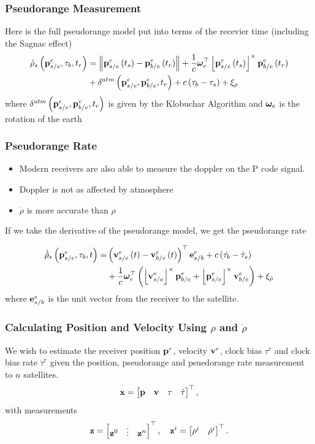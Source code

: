 \documentclass{beamer}
\newcommand{\norm}[1]{\left\lVert#1\right\rVert}
\begin{document}
\begin{frame}\frametitle{Pseudorange Measurement}
Here is the full pseudorange model put into terms of the recevier time (including the Sagnac effect)
\begin{align*}
\hat{\rho}_{s}\left(\p_{s/e}^{e},\tau_{b},t_r\right) &= \norm{\p_{s/e}^{e}\left(t_s\right)-\p_{b/e}^{e}\left(t_r\right)}+\frac{1}{c}\w_{e}^{\top}
\skew{\p_{s/e}^{e}\left(t_s\right)}\p_{b/e}^{e}\left(t_r\right)\\
&+\delta^{atm}\left(\p_{s/e}^{e},\p_{b/e}^{e},t_r\right)+c\left(\tau_{b}-\tau_{s}\right)+\xi_{\rho}
\end{align*}
where $\delta^{atm}\left(\mathbf{p}_{s/e}^{e},\mathbf{p}_{b/e}^{e},t_r\right)$ is given
by the Klobuchar Algorithm and $\boldsymbol{\omega}_{e}$ is the rotation of the earth
\end{frame}


\begin{frame}\frametitle{Pseudorange Rate}
\begin{itemize}
	\item Modern receivers are also able to measure the doppler on the P code signal.
	\item Doppler is not as affected by atmosphere
	\item $\dot{\rho}$ is more accurate than $\rho$
\end{itemize}
If we take the derivative of the pseudorange model, we get the pseudorange rate

\begin{align}
	\dot{\hat{\rho}}_{s}\left(\mathbf{p}_{s/e}^{e},\tau_{b},t\right) =& \left(\mathbf{v}_{s/e}^{e}\left(t\right)-\mathbf{v}_{b/e}^{e}\left(t\right)\right)^\top \mathbf{e}_{s/b}^e+c\left(\dot{\tau_{b}}-\dot{\tau}_{s}\right) \\ 
															  & + \frac{1}{c}\boldsymbol{\omega}_e^\top \left(\left\lfloor \mathbf{v}_{s/e}^e\right\rfloor ^{\times}\mathbf{p}_{b/e}^e + \left\lfloor \mathbf{p}_{s/e}^e\right\rfloor ^{\times}\mathbf{v}_{b/e}^e\right)
	                                                           +\xi_{\dot{\rho}}
\end{align}
where $\mathbf{e}_{s/b}^e$ is the unit vector from the receiver to the satellite.
\end{frame}

\begin{frame}\frametitle{Calculating Position and Velocity Using $\rho$ and $\dot{\rho}$}
We wish to estimate the receiver position $\mathbf{p}^{r}$,
velocity $\mathbf{v}^{r}$, clock bias $\tau^{r}$ and clock bias rate $\dot{\tau}^{r}$
given the position, pseudorange and psuedorange rate measurement to $n$ satellites.
\begin{equation}
	\mathbf{x}=\begin{bmatrix}\mathbf{p}& \mathbf{v}& \tau& \dot{\tau} \end{bmatrix}^\top,
\end{equation}
with measurements
\begin{equation}
	\mathbf{z}=\begin{bmatrix}\mathbf{z}^{0}& \vdots& \mathbf{z}^{n} \end{bmatrix}^\top, 
	\quad\mathbf{z}^{i}=\begin{bmatrix}\rho^{i}& \dot{\rho}^{i} \end{bmatrix}^\top.
\end{equation}
\end{frame}
\end{document}
